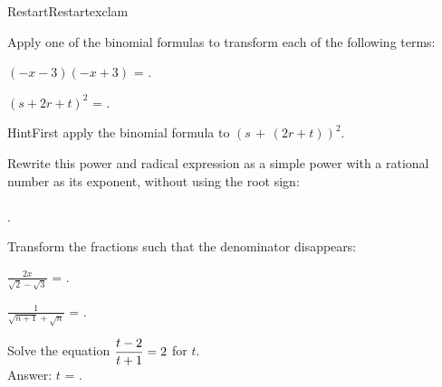 \begin{MXContent}{Restart}{Restart}{exclam}
\begin{MExercise}
Apply one of the binomial formulas to transform each of the following terms:
\begin{MExerciseItems}
\item{$(-x-3)(-x+3)$ = .}
\item{$(s+2r+t)^2$ = .\\\begin{MHint}{Hint}First apply the binomial formula to $(s\,+\,(2r+t))^2$.\end{MHint}}
\end{MExerciseItems}
\end{MExercise}

\begin{MExercise}
Rewrite this power and radical expression as a simple power with a rational number as its exponent, without using the root sign:
\ \\ \ \\
.\\
\end{MExercise}

\begin{MExercise}
Transform the fractions such that the denominator disappears:
\begin{MExerciseItems}
\item{$\frac{2x}{\sqrt{2}-\sqrt{3}}$ = .}
\item{$\frac{1}{\sqrt{n+1}+\sqrt{n}}$ = .}
\end{MExerciseItems}
\end{MExercise}

\begin{MExercise}
Solve the equation $\dfrac{t-2}{t+1}=2$ for $t$.\ \\
Answer: $t$ = \: .
\end{MExercise}


\end{MXContent}
